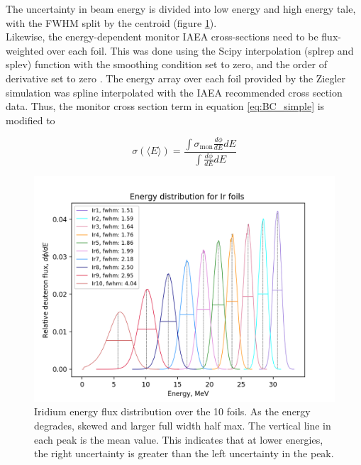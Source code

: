 \noindent 
The uncertainty in beam energy is divided into low energy and high energy tale, with the FWHM split by the centroid (figure \ref{fig:ir_energyflux}). \\ 

\noindent 
Likewise, the energy-dependent monitor IAEA cross-sections need to be flux-weighted over each foil. This was done using the Scipy interpolation (splrep and splev) function with the smoothing condition set to zero, and the order of derivative set to zero \cite{Virtanen2020}. The energy array over each foil provided by the Ziegler simulation was spline interpolated with the IAEA recommended cross section data. Thus, the monitor cross section term in equation \ref{eq:BC_simple} is modified to 


\begin{equation}
    \sigma (\langle E\rangle) = \frac{\int \sigma_\text{mon} \frac{d\phi}{dE}dE}{\int \frac{d\phi}{dE}dE}
\end{equation}


\begin{figure}
    \centering
    \includegraphics{Analysis/Ir_flux_distribution_B_+2_D_+4,25.png}
    \caption{Iridium energy flux distribution over the 10 foils. As the energy degrades, skewed and larger full width half max. The vertical line in each peak is the mean value. This indicates that at lower energies, the right uncertainty is greater than the left uncertainty in the peak.}
    \label{fig:ir_energyflux}
\end{figure}

